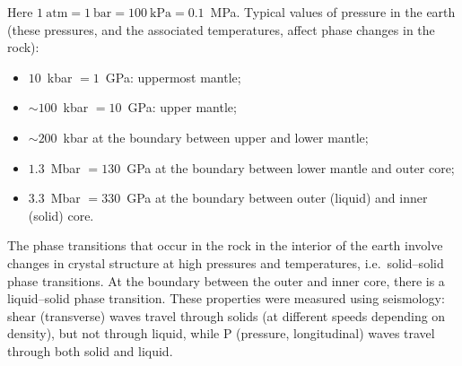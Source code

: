 Here $1\ \text{atm} = 1\ \text{bar} = 100\ \text{kPa} = 0.1$~MPa. Typical values of
pressure in the earth (these pressures, and the associated temperatures, affect phase
changes in the rock):
\begin{itemize}
  \item $10$~kbar $= 1$~GPa: uppermost mantle;
  \item $\sim 100$~kbar $= 10$~GPa: upper mantle;
  \item $\sim 200$~kbar at the boundary between upper and lower mantle;
  \item $1.3$~Mbar $= 130$~GPa at the boundary between lower mantle and outer core;
  \item $3.3$~Mbar $= 330$~GPa at the boundary between outer (liquid) and inner (solid)
    core.
\end{itemize}
The phase transitions that occur in the rock in the interior of the earth involve
changes in crystal structure at high pressures and temperatures, i.e.\ solid--solid
phase transitions. At the boundary between the outer and inner core, there is a
liquid--solid phase transition. These properties were measured using seismology:
shear (transverse) waves travel through solids (at different speeds depending on
density), but not through liquid, while P (pressure, longitudinal) waves travel
through both solid and liquid.
